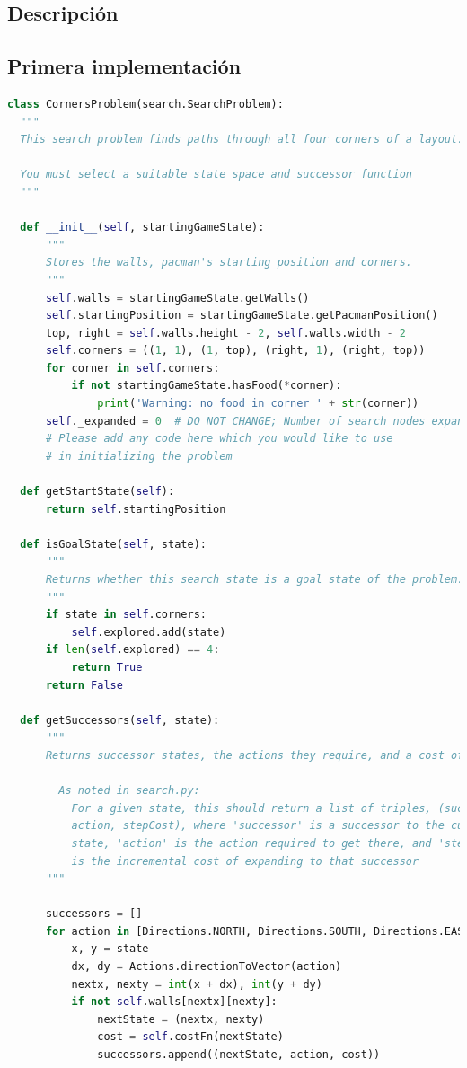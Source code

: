 \documentclass{report}
\begin{document}
        \subsection*{Descripción}
        \subsection*{Primera implementación}
          \begin{lstlisting}[language=Python, caption=Implementación inicial del problema de las esquinas]
class CornersProblem(search.SearchProblem):
  """
  This search problem finds paths through all four corners of a layout.

  You must select a suitable state space and successor function
  """

  def __init__(self, startingGameState):
      """
      Stores the walls, pacman's starting position and corners.
      """
      self.walls = startingGameState.getWalls()
      self.startingPosition = startingGameState.getPacmanPosition()
      top, right = self.walls.height - 2, self.walls.width - 2
      self.corners = ((1, 1), (1, top), (right, 1), (right, top))
      for corner in self.corners:
          if not startingGameState.hasFood(*corner):
              print('Warning: no food in corner ' + str(corner))
      self._expanded = 0  # DO NOT CHANGE; Number of search nodes expanded
      # Please add any code here which you would like to use
      # in initializing the problem
              
  def getStartState(self):
      return self.startingPosition

  def isGoalState(self, state):
      """
      Returns whether this search state is a goal state of the problem.
      """
      if state in self.corners:
          self.explored.add(state)
      if len(self.explored) == 4:
          return True
      return False

  def getSuccessors(self, state):
      """
      Returns successor states, the actions they require, and a cost of 1.

        As noted in search.py:
          For a given state, this should return a list of triples, (successor,
          action, stepCost), where 'successor' is a successor to the current
          state, 'action' is the action required to get there, and 'stepCost'
          is the incremental cost of expanding to that successor
      """

      successors = []
      for action in [Directions.NORTH, Directions.SOUTH, Directions.EAST, Directions.WEST]:
          x, y = state
          dx, dy = Actions.directionToVector(action)
          nextx, nexty = int(x + dx), int(y + dy)
          if not self.walls[nextx][nexty]:
              nextState = (nextx, nexty)
              cost = self.costFn(nextState)
              successors.append((nextState, action, cost))


\end{lstlisting}
\end{document}
